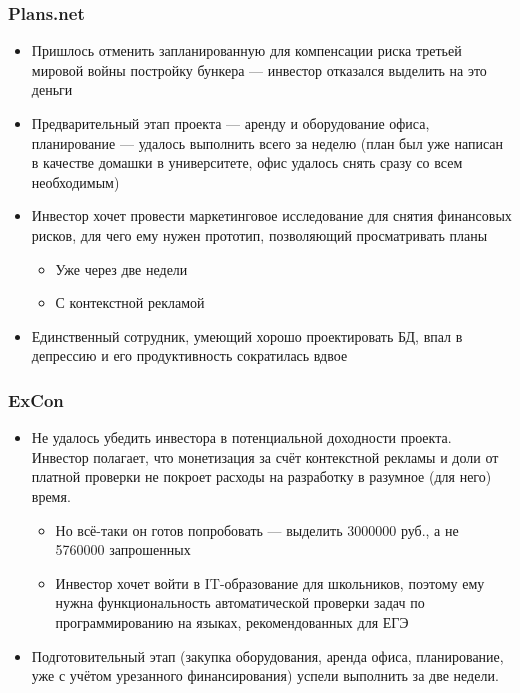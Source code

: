 \documentclass[xetex,mathserif,serif]{beamer}
\begin{document}
	\begin{frame}
		\frametitle{Plans.net}
		\begin{itemize}
			\item Пришлось отменить запланированную для компенсации риска третьей мировой войны постройку бункера --- инвестор отказался выделить на это деньги
			\item Предварительный этап проекта --- аренду и оборудование офиса, планирование --- удалось выполнить всего за неделю (план был уже написан в качестве домашки в университете, офис удалось снять сразу со всем необходимым)
			\item Инвестор хочет провести маркетинговое исследование для снятия финансовых рисков, для чего ему нужен прототип, позволяющий просматривать планы
			\begin{itemize}
				\item Уже через две недели
				\item С контекстной рекламой
			\end{itemize}
			\item Единственный сотрудник, умеющий хорошо проектировать БД, впал в депрессию и его продуктивность сократилась вдвое
		\end{itemize}
	\end{frame}

	\begin{frame}
		\frametitle{ExCon}
		\begin{itemize}
			\item Не удалось убедить инвестора в потенциальной доходности проекта. Инвестор полагает, что монетизация за счёт контекстной рекламы и доли от платной проверки не покроет расходы на разработку в разумное (для него) время.
			\begin{itemize}
				\item Но всё-таки он готов попробовать --- выделить 3000000 руб., а не 5760000 запрошенных
				\item Инвестор хочет войти в IT-образование для школьников, поэтому ему нужна функциональность автоматической проверки задач по программированию на языках, рекомендованных для ЕГЭ
			\end{itemize}
			\item Подготовительный этап (закупка оборудования, аренда офиса, планирование, уже с учётом урезанного финансирования) успели выполнить за две недели.
		\end{itemize}
	\end{frame}
\end{document}
